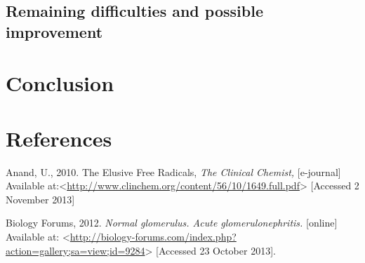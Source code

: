 \documentclass[paper=a4, french, 11pt]{scrartcl}
\begin{document}
\subsection{Remaining difficulties and possible improvement}

\section{Conclusion}


\newpage
\section*{References}

Anand, U., 2010. The Elusive Free Radicals, \textit{The Clinical Chemist,} [e-journal] Available at:<\url{http://www.clinchem.org/content/56/10/1649.full.pdf}> [Accessed 2 November 2013]
\newline
\newline

Biology Forums, 2012. \textit{Normal glomerulus. Acute glomerulonephritis.} [online] Available at: <\url{http://biology-forums.com/index.php?action=gallery;sa=view;id=9284}> [Accessed 23 October 2013].
\newline
\newline
\end{document}
